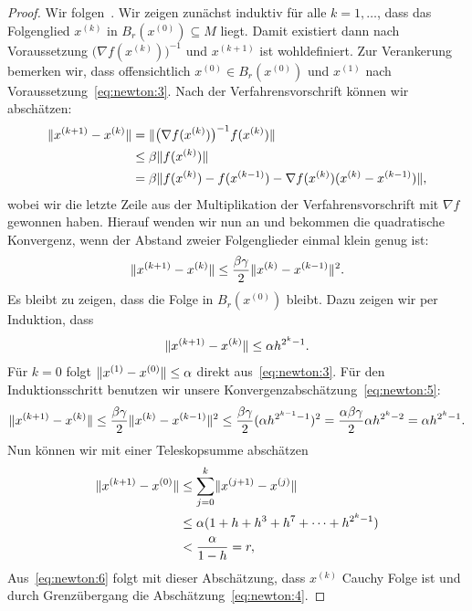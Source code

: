 \begin{proof}
  Wir folgen~\cite[Satz 5.3.2]{Stoer83}.
  Wir zeigen zunächst induktiv für alle $k=1,\dots$, dass das
  Folgenglied $x^{(k)}$ in $B_r(x^{(0)}) \subseteq M$ liegt. Damit
  existiert dann nach Voraussetzung
  $\bigl(\nabla f(x^{(k)})\bigr)^{-1}$ und $x^{(k+1)}$ ist
  wohldefiniert. Zur Verankerung bemerken wir, dass offensichtlich
  $x^{(0)}\in B_r(x^{(0)})$ und $x^{(1)}$ nach
  Voraussetzung~\eqref{eq:newton:3}. Nach der Verfahrensvorschrift
  können wir abschätzen:
  \begin{align}
    \lVert x^{(k+1)} - x^{(k)}\rVert
    & = \lVert\bigl(\nabla f(x^{(k)})\bigr)^{-1} f(x^{(k)})\rVert\\
    & \le \beta \lVert f(x^{(k)})\rVert\\
    & = \beta \lVert f(x^{(k)}) - f(x^{(k-1)}) - \nabla f(x^{(k)})(x^{(k)}-x^{(k-1)})\rVert,
  \end{align}
  wobei wir die letzte Zeile aus der Multiplikation der
  Verfahrensvorschrift mit $\nabla f$ gewonnen haben. Hierauf wenden
  wir nun  an und bekommen die quadratische
  Konvergenz, wenn der Abstand zweier Folgenglieder einmal klein genug
  ist:
  \begin{gather}
    \label{eq:newton:5}
    \lVert x^{(k+1)} - x^{(k)}\rVert
    \le \frac{\beta\gamma}2 \lVert x^{(k)} - x^{(k-1)}\rVert^2.
  \end{gather}
  Es bleibt zu zeigen, dass die Folge in $B_r(x^{(0)})$ bleibt. Dazu
  zeigen wir per Induktion, dass
  \begin{gather}
    \label{eq:newton:6}
    \lVert x^{(k+1)} - x^{(k)}\rVert \le \alpha h^{2^k-1}.
  \end{gather}
  Für $k=0$ folgt $\lVert x^{(1)} - x^{(0)}\rVert \le \alpha$ direkt
  aus~\eqref{eq:newton:3}. Für den Induktionsschritt benutzen wir
  unsere Konvergenzabschätzung~\eqref{eq:newton:5}:
  \begin{gather}
    \lVert x^{(k+1)} - x^{(k)}\rVert
    \le \frac{\beta\gamma}2 \lVert x^{(k)} - x^{(k-1)}\rVert^2
    \le \frac{\beta\gamma}2 (\alpha h^{2^{k-1}-1})^2
    = \frac{\alpha\beta\gamma}2 \alpha h^{2^k-2}
    = \alpha h^{2^k-1}.
  \end{gather}
  Nun können wir mit einer Teleskopsumme abschätzen
  \begin{align}
    \lVert x^{(k+1)} - x^{(0)}\rVert
    &\le \sum_{j=0}^k \lVert x^{(j+1)} - x^{(j)}\rVert\\
    & \le \alpha (1+h+h^3+h^7+\dots+h^{2^k-1})\\
    &<\frac\alpha{1-h} = r,
  \end{align}
  Aus~\eqref{eq:newton:6} folgt mit dieser Abschätzung, dass $x^{(k)}$
  Cauchy Folge ist und durch Grenzübergang die
  Abschätzung~\eqref{eq:newton:4}.
\end{proof}

